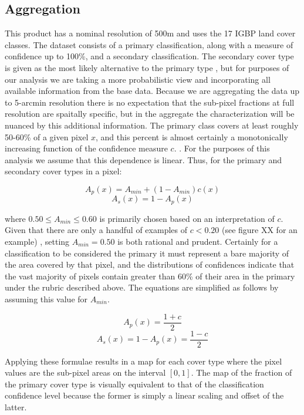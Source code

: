 \subsection{Aggregation}
\label{sec:mlct-aggr}

This product has a nominal resolution of 500m and uses the 17 IGBP
land cover classes. The dataset consists of a primary classification,
along with a measure of confidence up to 100\%, and a secondary
classification.  The secondary cover type is given as the most likely
alternative to the primary type \citep{Friedl2010}, but for purposes
of our analysis we are taking a more probabilistic view and
incorporating all available information from the base data.  Because
we are aggregating the data up to 5-arcmin resolution there is no
expectation that the sub-pixel fractions at full resolution are
spaitally specific, but in the aggregate the characterization will be
nuanced by this additional information.  The primary class covers at
least roughly 50-60\% of a given pixel $x$, and this percent is almost
certainly a monotonically increasing function of the confidence
measure $c$.  .  For the purposes of this
analysis we assume that this dependence is linear. Thus, for the
primary and secondary cover types in a pixel:

$$
A_p(x) = A_{min} + (1 - A_{min}) c(x)
$$
$$
A_s(x) = 1 - A_p(x)
$$

where $0.50 \le A_{min} \le 0.60$ is primarily chosen based on an
interpretation of $c$.  Given that there are only a handful of
examples of $c < 0.20$ (see figure XX for an example) , setting $A_{min} =
0.50$ is both rational and prudent.  Certainly for a classification to
be considered the primary it must represent a bare majority of the
area covered by that pixel, and the distributions of confidences
indicate that the vast majority of pixels contain greater than 60\% of
their area in the primary under the rubric described above. The
equations are simplified as follows by assuming this value for
$A_{min}$.

$$
A_p(x) = \dfrac{1 + c}{2}
$$
$$
A_s(x) = 1 - A_p(x) = \dfrac{1-c}{2}
$$

Applying these formulae results in a map for each cover type where the
pixel values are the sub-pixel areas on the interval $[0,1]$.  The map
of the fraction of the primary cover type is visually equivalent to
that of the classification confidence level because the former is
simply a linear scaling and offset of the latter.  

